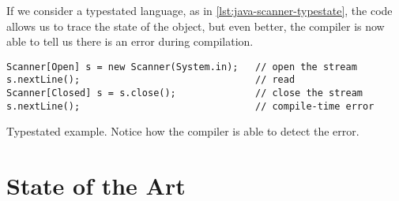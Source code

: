 If we consider a typestated language, as in \autoref{lst:java-scanner-typestate},
the code allows us to trace the state of the object, but even better,
the compiler is now able to tell us there is an error during compilation.

\begin{listing}
    \begin{verbatim}
Scanner[Open] s = new Scanner(System.in);   // open the stream
s.nextLine();                               // read
Scanner[Closed] s = s.close();              // close the stream
s.nextLine();                               // compile-time error
    \end{verbatim}
    \caption{
        Typestated  example.
        Notice how the compiler is able to detect the error.
    }
    \label{lst:java-scanner-typestate}
\end{listing}

\section{State of the Art}









